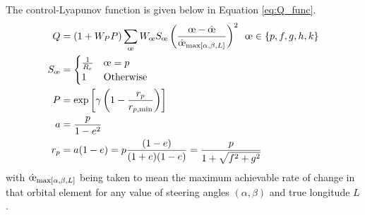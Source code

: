 The control-Lyapunov function is given below in Equation \ref{eq:Q_func}.
\begin{align}
    Q        & = (1+W_P P) \sum_{\moe} W_{\moe} S_{\moe} \left(\frac{\moe - \hat{\moe}}{\dot{\moe}_{\maxrocall}} \right)^2 \ \, \moe \in \{p, f, g, h, k\} \label{eq:Q_func} \\
    S_{\moe} & = \begin{cases}
                     \frac{1}{R_e} & \moe = p         \\
                     1             & \text{Otherwise} \\
                 \end{cases} \nonumber                                                                                                                            \\
    P        & = \exp\left[\gamma \left( 1 - \frac{r_p}{r_{p, \text{min}}} \right) \right] \nonumber                                                                         \\
    a        & = \frac{p}{1-e^2} \nonumber                                                                                                                                   \\
    r_{p}    & = a (1-e) = p\frac{(1-e)}{(1+e)(1-e)} = \frac{p}{1+\sqrt{f^2 + g^2}} \nonumber
\end{align}
with \(\dot{\moe}_{\maxrocall}\) being taken to mean the maximum achievable rate of change in that orbital element for any value of steering angles \((\alpha, \beta)\) and true longitude \(L\).

